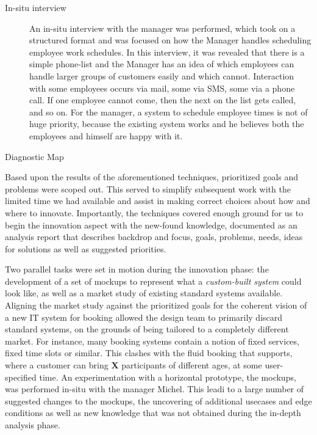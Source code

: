 \begin{description}
    \item [In-situ interview] An in-situ interview with the manager was
        performed, which took on a structured format and was focused on how the
        Manager handles scheduling employee work schedules. In this interview,
        it was revealed that there is a simple phone-list and the Manager has an
        idea of which employees can handle larger groups of customers easily and
        which cannot. Interaction with some employees occurs via mail, some via
        SMS, some via a phone call. If one employee cannot come, then the next
        on the list gets called, and so on. For the manager, a system to
        schedule employee times is not of huge priority, because the existing
        system works and he believes both the employees and himself are happy
        with it.
    \item [Diagnostic Map] 
\end{description}

Based upon the results of the aforementioned techniques, prioritized goals and
problems were scoped out. This served to simplify subsequent work with the
limited time we had available and assist in making correct choices about how and
where to innovate. Importantly, the techniques covered enough ground for us to
begin the innovation aspect with the new-found knowledge, documented as an
analysis report\cite[p. 159]{bodker2004participatory} that describes backdrop
and focus, goals, problems, needs, ideas for solutions as well as suggested
priorities.

Two parallel tasks were set in motion during the innovation phase: the
development of a set of mockups to represent what a \textit{custom-built system}
could look like, as well as a market study of existing standard systems
available. Aligning the market study against the prioritized goals for the
coherent vision of a new IT system for booking allowed the design team to
primarily discard standard systems, on the grounds of being tailored to a
completely different market. For instance, many booking systems contain a notion
of fixed services, fixed time slots or similar. This clashes with the fluid
booking that \gomonkey{} supports, where a customer can bring \textbf{X}
participants of different ages, at some user-specified time. An experimentation
with a horizontal prototype, the mockups, was performed in-situ with the manager
Michel. This leadi to a large number of suggested changes to the mockups, the uncovering of
additional usecases and edge conditions as well as new knowledge that was not obtained
during the in-depth analysis phase.

